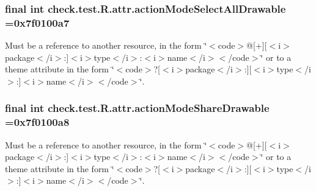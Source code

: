 \subsubsection[{action\+Mode\+Select\+All\+Drawable}]{\setlength{\rightskip}{0pt plus 5cm}final int check.\+test.\+R.\+attr.\+action\+Mode\+Select\+All\+Drawable =0x7f0100a7\hspace{0.3cm}{\ttfamily [static]}}\label{classcheck_1_1test_1_1_r_1_1attr_a3c633deb9c01f4bdde7415f1db6815b0}
Must be a reference to another resource, in the form \char`\"{}$<$code$>$@\mbox{[}+\mbox{]}\mbox{[}$<$i$>$package$<$/i$>$\+:\mbox{]}$<$i$>$type$<$/i$>$\+:$<$i$>$name$<$/i$>$$<$/code$>$\char`\"{} or to a theme attribute in the form \char`\"{}$<$code$>$?\mbox{[}$<$i$>$package$<$/i$>$\+:\mbox{]}\mbox{[}$<$i$>$type$<$/i$>$\+:\mbox{]}$<$i$>$name$<$/i$>$$<$/code$>$\char`\"{}. \hypertarget{classcheck_1_1test_1_1_r_1_1attr_ac472f4499bff65d116305db33c9635a7}{}
\subsubsection[{action\+Mode\+Share\+Drawable}]{\setlength{\rightskip}{0pt plus 5cm}final int check.\+test.\+R.\+attr.\+action\+Mode\+Share\+Drawable =0x7f0100a8\hspace{0.3cm}{\ttfamily [static]}}\label{classcheck_1_1test_1_1_r_1_1attr_ac472f4499bff65d116305db33c9635a7}
Must be a reference to another resource, in the form \char`\"{}$<$code$>$@\mbox{[}+\mbox{]}\mbox{[}$<$i$>$package$<$/i$>$\+:\mbox{]}$<$i$>$type$<$/i$>$\+:$<$i$>$name$<$/i$>$$<$/code$>$\char`\"{} or to a theme attribute in the form \char`\"{}$<$code$>$?\mbox{[}$<$i$>$package$<$/i$>$\+:\mbox{]}\mbox{[}$<$i$>$type$<$/i$>$\+:\mbox{]}$<$i$>$name$<$/i$>$$<$/code$>$\char`\"{}. \hypertarget{classcheck_1_1test_1_1_r_1_1attr_ab54b0e4c2777d73f47b3f7d655ecc84e}{}
